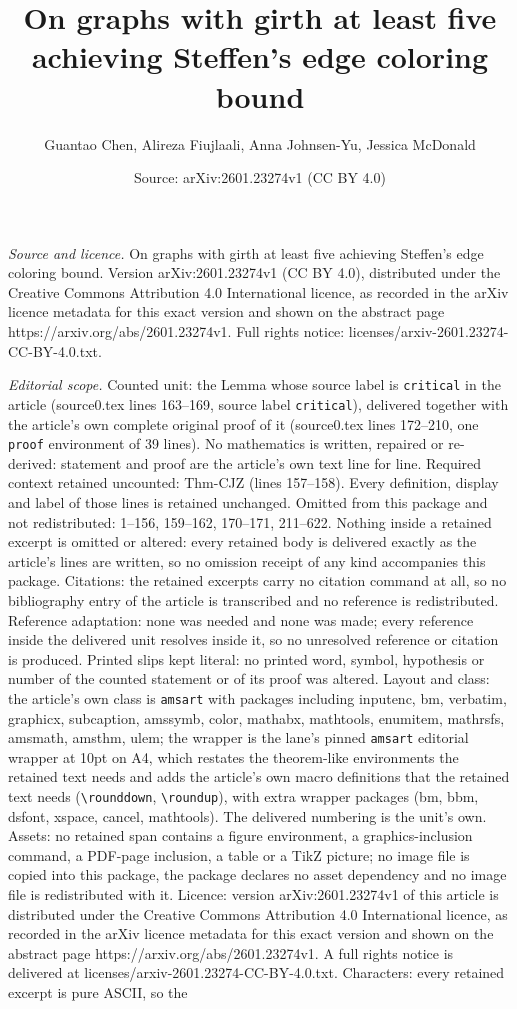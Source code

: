\documentclass[10pt,a4paper]{amsart}
\title[On graphs with girth at least five achieving Steffen's edge ]{On graphs with girth at least five achieving Steffen's edge coloring bound}
\author{Guantao Chen, Alireza Fiujlaali, Anna Johnsen-Yu, Jessica McDonald}
\date{Source: arXiv:2601.23274v1 (CC BY 4.0)}
\begin{document}
\maketitle

\noindent\emph{Source and licence.} On graphs with girth at least five achieving Steffen's edge coloring bound. Version arXiv:2601.23274v1 (CC BY 4.0), distributed under the Creative Commons Attribution 4.0 International licence, as recorded in the arXiv licence metadata for this exact version and shown on the abstract page https://arxiv.org/abs/2601.23274v1. Full rights notice: licenses/arxiv-2601.23274-CC-BY-4.0.txt.\par\smallskip

\noindent\textit{Editorial scope.} Counted unit: the Lemma whose source label is \texttt{critical} in the article (source0.tex lines 163--169, source label \texttt{critical}), delivered together with the article's own complete original proof of it (source0.tex lines 172--210, one \texttt{proof} environment of 39 lines). No mathematics is written, repaired or re-derived: statement and proof are the article's own text line for line. Required context retained uncounted: Thm-CJZ (lines 157--158). Every definition, display and label of those lines is retained unchanged. Omitted from this package and not redistributed: 1--156, 159--162, 170--171, 211--622. Nothing inside a retained excerpt is omitted or altered: every retained body is delivered exactly as the article's lines are written, so no omission receipt of any kind accompanies this package. Citations: the retained excerpts carry no citation command at all, so no bibliography entry of the article is transcribed and no reference is redistributed. Reference adaptation: none was needed and none was made; every reference inside the delivered unit resolves inside it, so no unresolved reference or citation is produced. Printed slips kept literal: no printed word, symbol, hypothesis or number of the counted statement or of its proof was altered. Layout and class: the article's own class is \texttt{amsart} with packages including inputenc, bm, verbatim, graphicx, subcaption, amssymb, color, mathabx, mathtools, enumitem, mathrsfs, amsmath, amsthm, ulem; the wrapper is the lane's pinned \texttt{amsart} editorial wrapper at 10pt on A4, which restates the theorem-like environments the retained text needs and adds the article's own macro definitions that the retained text needs (\texttt{\textbackslash rounddown}, \texttt{\textbackslash roundup}), with extra wrapper packages (bm, bbm, dsfont, xspace, cancel, mathtools). The delivered numbering is the unit's own. Assets: no retained span contains a figure environment, a graphics-inclusion command, a PDF-page inclusion, a table or a TikZ picture; no image file is copied into this package, the package declares no asset dependency and no image file is redistributed with it. Licence: version arXiv:2601.23274v1 of this article is distributed under the Creative Commons Attribution 4.0 International licence, as recorded in the arXiv licence metadata for this exact version and shown on the abstract page https://arxiv.org/abs/2601.23274v1. A full rights notice is delivered at licenses/arxiv-2601.23274-CC-BY-4.0.txt. Characters: every retained excerpt is pure ASCII, so the 
\end{document}
